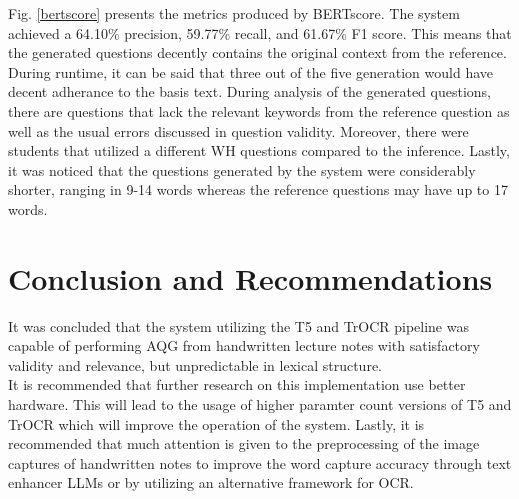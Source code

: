 \documentclass[conference]{IEEEtran}
\begin{document}
\indent Fig. \ref{bertscore} presents the metrics produced by 
BERTscore. The system achieved a 64.10\% precision, 59.77\%
recall, and 61.67\% F1 score. This means that the generated 
questions decently contains the original context from the 
reference. During runtime, 
it can be said that three out of the five generation 
would have decent adherance to the basis text. During 
analysis of the generated questions, there are 
questions that lack the relevant keywords from the 
reference question as well as the usual errors discussed in question 
validity. Moreover, there were students that utilized a 
different WH questions compared to the inference. Lastly, 
it was noticed that the questions generated by the system 
were considerably shorter, ranging in 9-14 words whereas 
the reference questions may have up to 17 words.
\section{Conclusion and Recommendations}
    \indent It was concluded that the system utilizing the T5 and TrOCR 
    pipeline was capable of performing AQG from handwritten lecture notes
    with satisfactory validity and relevance, but unpredictable in 
    lexical structure. \\
    \indent It is recommended that further research on 
    this implementation use better hardware. This will lead 
    to the usage of higher paramter count versions of T5 and TrOCR 
    which will improve the operation of the system. Lastly, it is 
    recommended that much attention is given to the preprocessing of 
    the image captures of handwritten notes to improve the word 
    capture accuracy through text enhancer LLMs or by utilizing 
    an alternative framework for OCR. 



\end{document}
